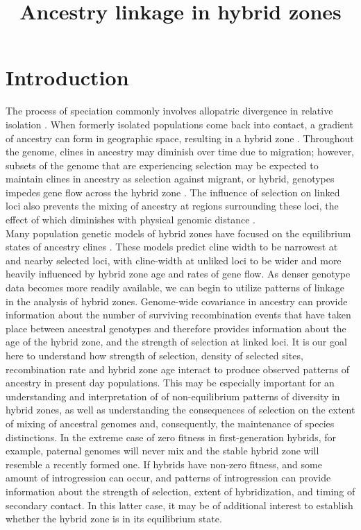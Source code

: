 \documentclass[12pt]{amsart}
\title{Ancestry linkage in hybrid zones}
\author{}
\date{} %
\begin{document}
\maketitle

\section{Introduction}
The process of speciation commonly involves allopatric divergence in relative isolation \cite{Coyne2004}. When formerly isolated populations come back into contact, a gradient of ancestry can form in geographic space, resulting in a hybrid zone \cite{Barton1985}. Throughout the genome, clines in ancestry may diminish over time due to migration; however, subsets of the genome that are experiencing selection may be expected to maintain clines in ancestry as selection against migrant, or hybrid, genotypes impedes gene flow across the hybrid zone \cite{Barton1979a}. The influence of selection on linked loci also prevents the mixing of ancestry at regions surrounding these loci, the effect of which diminishes with physical genomic distance \cite{Barton1986}.\\

Many population genetic models of hybrid zones have focused on the equilibrium states of ancestry clines \cite{Barton1979a,Barton1986}. These models predict cline width to be narrowest at and nearby selected loci, with cline-width at unliked loci to be wider and more heavily influenced by hybrid zone age and rates of gene flow. As denser genotype data becomes more readily available, we can begin to utilize patterns of linkage in the analysis of hybrid zones. Genome-wide covariance in ancestry can provide information about the number of surviving recombination events that have taken place between ancestral genotypes and therefore provides information about the age of the hybrid zone, and the strength of selection at linked loci. It is our goal here to understand how strength of selection, density of selected sites, recombination rate and hybrid zone age interact to produce observed patterns of ancestry in present day populations. This may be especially important for an understanding and interpretation of of non-equilibrium patterns of diversity in hybrid zones, as well as understanding the consequences of selection on the extent of mixing of ancestral genomes and, consequently, the maintenance of species distinctions. In the extreme case of zero fitness in first-generation hybrids, for example, paternal genomes will never mix and the stable hybrid zone will resemble a recently formed one. If hybrids have non-zero fitness, and some amount of introgression can occur, and patterns of introgression can provide information about the strength of selection, extent of hybridization, and timing of secondary contact. In this latter case, it may be of additional interest to establish whether the hybrid zone is in its equilibrium state. \\
\end{document}
